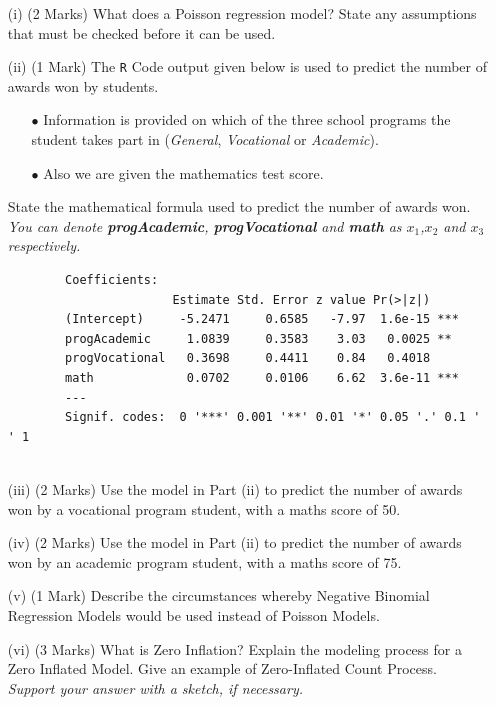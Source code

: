 \documentclass[a4paper,12pt]{article}
\begin{document}
\begin{enumerate}
\begin{enumerate}[(a)]
\begin{itemize}
	\item[(i)] (2 Marks)
	What does a Poisson regression model? State any assumptions that must be checked before it can be used.
	
	\item[(ii)] (1 Mark) The \texttt{R} Code output given below is used to predict the number of awards won by students. \begin{itemize} 
		\item[$\bullet$] Information is provided on which of the three school programs the student takes part in (\textit{General}, \textit{Vocational} or \textit{Academic}). 
		\item[$\bullet$] Also we are given the mathematics test score.
	\end{itemize}
	State the mathematical formula used to predict the number of awards won.\\
	\textit{You can denote \textbf{progAcademic}, \textbf{progVocational} and \textbf{math} as $x_1$,$x_2$ and $x_3$ respectively.}
	
	
	\begin{framed}
		\begin{verbatim}
		Coefficients:
		               Estimate Std. Error z value Pr(>|z|)    
		(Intercept)     -5.2471     0.6585   -7.97  1.6e-15 ***
		progAcademic     1.0839     0.3583    3.03   0.0025 ** 
		progVocational   0.3698     0.4411    0.84   0.4018    
		math             0.0702     0.0106    6.62  3.6e-11 ***
		---
		Signif. codes:  0 '***' 0.001 '**' 0.01 '*' 0.05 '.' 0.1 ' ' 1
		
		\end{verbatim}
	\end{framed}


	\item[(iii)] (2 Marks) Use the model in Part (ii) to predict the number of awards won by a vocational program student, with a maths score of 50.
	
	\item[(iv)] (2 Marks) Use the model in Part (ii) to predict the number of awards won by an academic program student, with a maths score of 75.
	
	\item[(v)] (1 Mark) Describe the circumstances whereby Negative Binomial Regression Models would be used instead of Poisson Models.	
	\item[(vi)] (3 Marks)
	What is Zero Inflation? Explain the modeling process for a Zero Inflated Model. Give an example of Zero-Inflated Count Process. \textit{Support your answer with a sketch, if necessary.}
	

\end{itemize}
\end{enumerate}
\end{enumerate}
\end{document}
